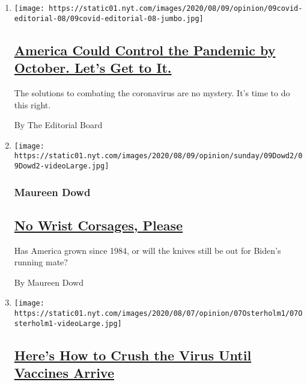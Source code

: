 \begin{enumerate}
\def\labelenumi{\arabic{enumi}.}
\item
  \texttt{[image: https://static01.nyt.com/images/2020/08/09/opinion/09covid-editorial-08/09covid-editorial-08-jumbo.jpg]}

  \hypertarget{america-could-control-the-pandemic-by-october-lets-get-to-it}{%
  \subsection{\texorpdfstring{\href{/2020/08/08/opinion/sunday/coronavirus-response-testing-lockdown.html}{America
  Could Control the Pandemic by October. Let's Get to
  It.}}{America Could Control the Pandemic by October. Let's Get to It.}}\label{america-could-control-the-pandemic-by-october-lets-get-to-it}}

  The solutions to combating the coronavirus are no mystery. It's time
  to do this right.

  By The Editorial Board
\item
  \texttt{[image: https://static01.nyt.com/images/2020/08/09/opinion/sunday/09Dowd2/09Dowd2-videoLarge.jpg]}

  \hypertarget{maureen-dowd}{%
  \subsubsection{Maureen Dowd}\label{maureen-dowd}}

  \hypertarget{no-wrist-corsages-please}{%
  \subsection{\texorpdfstring{\href{/2020/08/08/opinion/sunday/biden-vice-president-geraldine-ferraro.html}{No
  Wrist Corsages,
  Please}}{No Wrist Corsages, Please}}\label{no-wrist-corsages-please}}

  Has America grown since 1984, or will the knives still be out for
  Biden's running mate?

  By Maureen Dowd
\item
  \texttt{[image: https://static01.nyt.com/images/2020/08/07/opinion/07Osterholm1/07Osterholm1-videoLarge.jpg]}

  \hypertarget{heres-how-to-crush-the-virus-until-vaccines-arrive}{%
  \subsection{\texorpdfstring{\href{/2020/08/07/opinion/coronavirus-lockdown-unemployment-death.html}{Here's
  How to Crush the Virus Until Vaccines
  Arrive}}{Here's How to Crush the Virus Until Vaccines Arrive}}\label{heres-how-to-crush-the-virus-until-vaccines-arrive}}


\end{enumerate}
